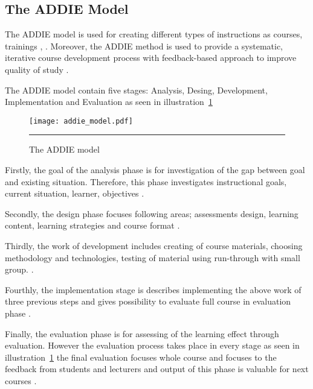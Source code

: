 \subsection{The ADDIE Model}

The \gls{ADDIE} model is used for creating different types of instructions as courses, trainings \citep{website:addie}, \citep{lohr1998using}. Moreover, the ADDIE method is  used to provide a systematic, iterative course development process with feedback-based approach to improve quality of study \citep{website:using_addie}.

The ADDIE model contain five stages: Analysis, Desing, Development, Implementation and Evaluation as seen in illustration~\ref{figure:the addie model} \citep{website:addie}



\begin{figure}[H] 
 \centering 
 \texttt{[image: addie\_model.pdf]}
 \rule{35em}{0.5pt} 
 \caption{The ADDIE model} 
 \label{figure:the addie model} 
\end{figure}

Firstly, the goal of the analysis phase is for investigation of the gap between goal and
existing situation. Therefore, this phase investigates instructional goals, current situation, learner, objectives \citep{chen2007learning} \citep{website:addie}.

Secondly, the design phase focuses following areas; assessments design, learning content, learning strategies and course format \citep{chen2007learning} \citep{website:addie}.


Thirdly, the work of development includes creating of course materials, choosing methodology and technologies, testing of material using run-through with small group. \citep{OppeArenduskeskus2010} \citep{website:addie} \citep{chen2007learning}.


Fourthly, the implementation stage is describes implementing the above work of three previous steps and gives possibility to evaluate full course in evaluation phase \citep{chen2007learning} \citep{website:addie}.


Finally, the evaluation phase is for assessing of the learning effect through evaluation. However the evaluation process takes place in every stage as seen in illustration~\ref{figure:the addie model} the final evaluation focuses whole course and focuses to the feedback from students and lecturers and output of this phase is valuable for next courses \citep{OppeArenduskeskus2010} \citep{website:addie}.



